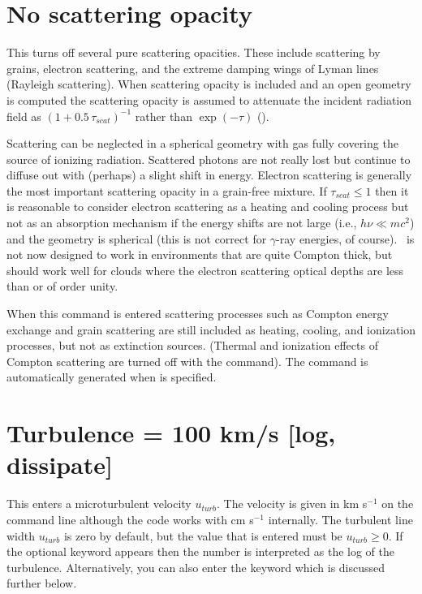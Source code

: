 \section{No scattering opacity}
\label{sec:CommandNoScatteringOpacity}

This turns off several pure scattering opacities.  These include
scattering by grains, electron scattering, and the extreme damping wings
of Lyman lines (Rayleigh scattering).
When scattering opacity is included
and an open geometry is computed the scattering opacity is assumed to
attenuate the incident radiation field as
$\left( {1 + 0.5\,\tau _{scat} } \right)^{ - 1} $
rather than $\exp \left( { - \tau } \right)$ (\citealp{Schuster1905}).

Scattering can be neglected in a spherical geometry with gas fully
covering the source of ionizing radiation.
Scattered photons are not really
lost but continue to diffuse out with (perhaps) a slight shift in energy.
Electron scattering is generally the most important scattering opacity in
a grain-free mixture.
If $ \tau _{scat}  \le 1$
then it is reasonable to consider electron scattering as a heating and
cooling process but not as an absorption mechanism if the energy shifts
are not large (i.e., $ h\nu \ll mc^2$) and the geometry is spherical
(this is not correct for $\gamma$-ray energies,
of course).
\Cloudy\ is not now designed to work in environments that are
quite Compton thick, but should work well for clouds where the electron
scattering optical depths are less than or of order unity.

When this command
is entered scattering processes such as Compton energy exchange 
and grain scattering are still included
as heating, cooling, and ionization processes, but not as extinction sources.
(Thermal and ionization effects of Compton scattering are turned off with
the  command).
The  command is automatically
generated when  is specified.

\section{Turbulence = 100 km/s [log, dissipate]}

This enters a microturbulent velocity $u_{turb}$.
The velocity is given in
km s$^{-1}$ on the command line although the code works with
cm s$^{-1}$ internally. The turbulent line width $u_{turb}$ is zero by default,
but the value that is entered must be $u_{turb} \ge 0$.
If the optional keyword  appears then the number
is interpreted as the log of the turbulence. Alternatively, you can
also enter the keyword  which is discussed
further below.

